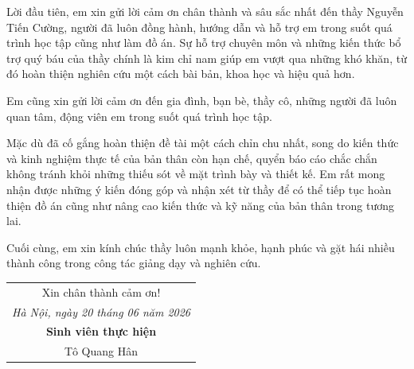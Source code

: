
\begin{acknowledgements}
	\addchaptertocentry{\acknowledgementname}
	\thispagestyle{empty}
	
	Lời đầu tiên, em xin gửi lời cảm ơn chân thành và sâu sắc nhất đến thầy Nguyễn Tiến Cường, người đã luôn đồng hành, hướng dẫn và hỗ trợ em trong suốt quá trình học tập cũng như làm đồ án. Sự hỗ trợ chuyên môn và những kiến thức bổ trợ quý báu của thầy chính là kim chỉ nam giúp em vượt qua những khó khăn, từ đó hoàn thiện nghiên cứu một cách bài bản, khoa học và hiệu quả hơn.
	
	Em cũng xin gửi lời cảm ơn đến gia đình, bạn bè, thầy cô, những người đã luôn quan tâm, động viên em trong suốt quá trình học tập.
	
	Mặc dù đã cố gắng hoàn thiện đề tài một cách chỉn chu nhất, song do kiến thức và kinh nghiệm thực tế của bản thân còn hạn chế, quyển báo cáo chắc chắn không tránh khỏi những thiếu sót về mặt trình bày và thiết kế. Em rất mong nhận được những ý kiến đóng góp và nhận xét từ thầy để có thể tiếp tục hoàn thiện đồ án cũng như nâng cao kiến thức và kỹ năng của bản thân trong tương lai.
	
	Cuối cùng, em xin kính chúc thầy luôn mạnh khỏe, hạnh phúc và gặt hái nhiều thành công trong công tác giảng dạy và nghiên cứu.

	\begin{flushright}
		\begin{tabular}{c}
			Xin chân thành cảm ơn! \\[0.6cm]
			\textit{Hà Nội, ngày 20 tháng 06 năm 2026} \\[0.2cm]
			\textbf{Sinh viên thực hiện} \\[1.5cm]
			Tô Quang Hân
		\end{tabular}
	\end{flushright}
\end{acknowledgements}